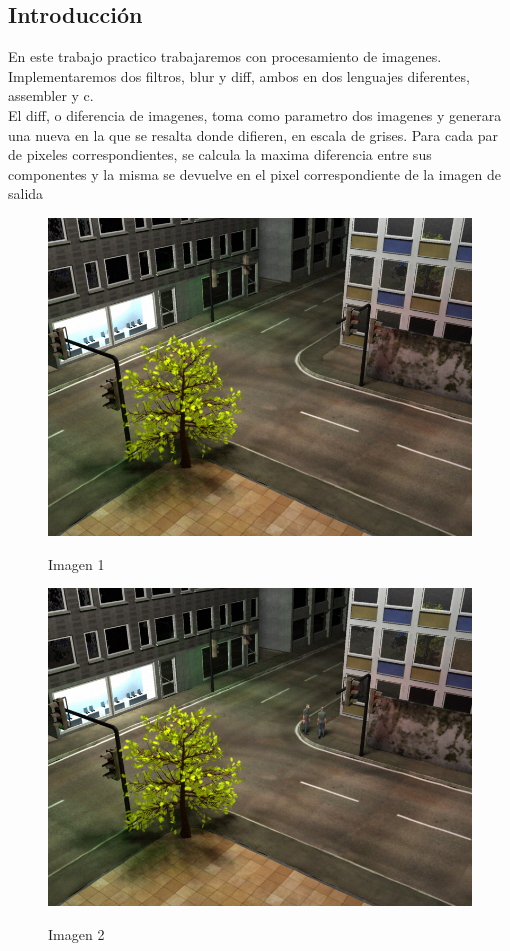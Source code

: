 

\subsection{Introducción}

En este trabajo practico trabajaremos con procesamiento de imagenes. Implementaremos dos filtros, blur y diff, ambos en dos lenguajes diferentes, assembler y c. \\


El diff, o diferencia de imagenes, toma como parametro dos imagenes y generara una nueva en la que se resalta donde difieren, en escala de grises. Para cada par de pixeles correspondientes, se calcula la maxima diferencia entre sus componentes y la misma se devuelve en el pixel correspondiente de la imagen de salida \\


\begin{figure}[H]
\begin{center}

  \includegraphics[width=\linewidth]{img/scene0(1).png}
  \caption{{\small Imagen 1}} \label{a}
\endminipage
{}
  \includegraphics[width=\linewidth]{img/scene400.png}
  \caption{{\small Imagen 2}} \label{b}
\endminipage

\end{center}
\end{figure}

